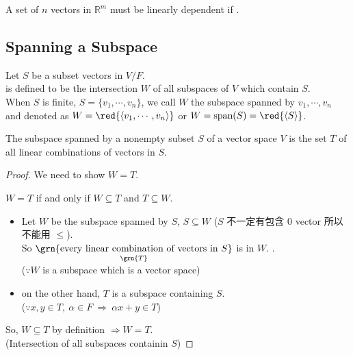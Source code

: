 \begin{proposition}
    A set of $n$ vectors in $\mathbb{R}^m$ must be linearly dependent if .
\end{proposition}

\newpage

\subsection{Spanning a Subspace}
\begin{definition}[2H]
    Let $S$ be a subset vectors in $V/F$. \\
     is defined to be the intersection $W$ of all subspaces of $V$ which contain $S$. \\
    When $S$ is finite, $S = \{v_1, \cdots, v_n\}$, we call $W$ the subspace spanned by $v_1, \cdots, v_n$ and denoted as $W = \red{\langle v_1, \cdots, v_n \rangle}$ or $W = \text{span}(S) = \red{\langle S \rangle}$.
\end{definition}

\begin{theorem}
    \red{[}The subspace spanned by a nonempty subset $S$\red{]} of a vector space $V$ is \red{[}the set $T$ of all linear combinations of vectors in $S$\red{]}.
\end{theorem}
\begin{proof}
    We need to show $W = T$.
    \begin{claim}
        $W = T$ if and only if $W \subseteq T$ and $T \subseteq W$.
    \end{claim}
    \begin{itemize}
        \item Let $W$ be the subspace spanned by $S$, $S \subseteq W$ ($S$ 不一定有包含 0 vector 所以不能用 $\leq$). \\
        So $\underset{\grn{T}}{\grn{\text{every linear combination of vectors in }S}}$ is in $W$. . \\
        ($\because W$ is a subspace which is a vector space)
        \item 
        on the other hand, $T$ is a subspace containing $S$. \\
        ($\because x, y \in T, \ \alpha \in F \ \Rightarrow \ \alpha x + y \in T$)
    \end{itemize}
    So, $W \subseteq T$ by definition $\Rightarrow W = T$. \\
    (Intersection of all subspaces containin $S$)
\end{proof}

